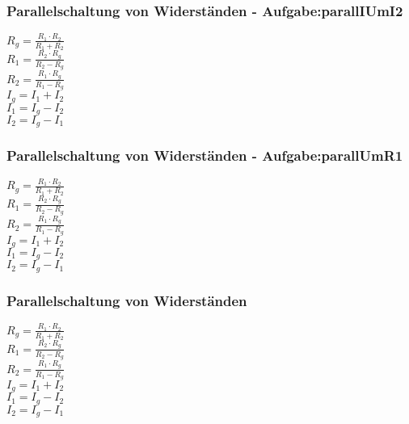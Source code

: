 \subsubsection{Parallelschaltung von Widerständen - Aufgabe:parallIUmI2} 
\begin{minipage}{0.45\textwidth} 
$ R_{g}  = \frac{R_{1} \cdot R_{2} }{R_{1} +R_{2} } $\\ 
$ R_{1}  = \frac{R_{2} \cdot R_{g} }{R_{2} -R_{g} } $\\ 
$ R_{2}  = \frac{R_{1} \cdot R_{g} }{R_{1} -R_{g} } $\\ 
$ I_{g}  = I_{1}  + I_{2} $\\ 
$ I_{1}  = I_{g}  - I_{2} $\\ 
$ I_{2}  = I_{g}  - I_{1} $\\ 
\end{minipage} 
\begin{minipage}{0.45\textwidth} 
 
\end{minipage} 
\subsubsection{Parallelschaltung von Widerständen - Aufgabe:parallUmR1} 
\begin{minipage}{0.45\textwidth} 
$ R_{g}  = \frac{R_{1} \cdot R_{2} }{R_{1} +R_{2} } $\\ 
$ R_{1}  = \frac{R_{2} \cdot R_{g} }{R_{2} -R_{g} } $\\ 
$ R_{2}  = \frac{R_{1} \cdot R_{g} }{R_{1} -R_{g} } $\\ 
$ I_{g}  = I_{1}  + I_{2} $\\ 
$ I_{1}  = I_{g}  - I_{2} $\\ 
$ I_{2}  = I_{g}  - I_{1} $\\ 
\end{minipage} 
\begin{minipage}{0.45\textwidth} 
 
\end{minipage} 
\subsubsection{Parallelschaltung von Widerständen} 
\begin{minipage}{0.45\textwidth} 
$ R_{g}  = \frac{R_{1} \cdot R_{2} }{R_{1} +R_{2} } $\\ 
$ R_{1}  = \frac{R_{2} \cdot R_{g} }{R_{2} -R_{g} } $\\ 
$ R_{2}  = \frac{R_{1} \cdot R_{g} }{R_{1} -R_{g} } $\\ 
$ I_{g}  = I_{1}  + I_{2} $\\ 
$ I_{1}  = I_{g}  - I_{2} $\\ 
$ I_{2}  = I_{g}  - I_{1} $\\ 
\end{minipage} 
\begin{minipage}{0.45\textwidth} 
 
\end{minipage} 
